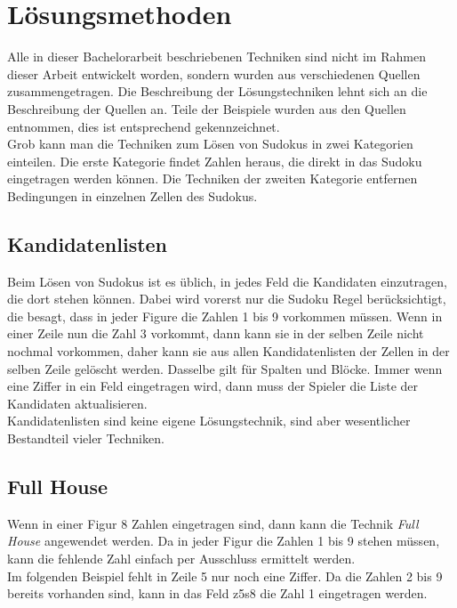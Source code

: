 \documentclass[accentcolor=tud6b,11pt,paper=a4]{tudreport}
\begin{document}
\chapter{L\"osungsmethoden}
Alle in dieser Bachelorarbeit beschriebenen Techniken sind nicht im Rahmen dieser Arbeit entwickelt worden, sondern wurden aus verschiedenen Quellen zusammengetragen. Die Beschreibung der L\"osungstechniken lehnt sich an die Beschreibung der Quellen an. Teile der Beispiele wurden aus den Quellen entnommen, dies ist entsprechend gekennzeichnet.\\
Grob kann man die Techniken zum L\"osen von Sudokus in zwei Kategorien einteilen. Die erste Kategorie findet Zahlen heraus, die direkt in das Sudoku eingetragen werden k\"onnen. Die Techniken der zweiten Kategorie entfernen Bedingungen in einzelnen Zellen des Sudokus.

\section{Kandidatenlisten}
Beim L\"osen von Sudokus ist es \"ublich, in jedes Feld die Kandidaten einzutragen, die dort stehen k\"onnen. Dabei wird vorerst nur die Sudoku Regel ber\"ucksichtigt, die besagt, dass in jeder Figure die Zahlen 1 bis 9 vorkommen m\"ussen. Wenn in einer Zeile nun die Zahl 3 vorkommt, dann kann sie in der selben Zeile nicht nochmal vorkommen, daher kann sie aus allen Kandidatenlisten der Zellen in der selben Zeile gel\"oscht werden. Dasselbe gilt f\"ur Spalten und Bl\"ocke. Immer wenn eine Ziffer in ein Feld eingetragen wird, dann muss der Spieler die Liste der Kandidaten aktualisieren.\\
Kandidatenlisten sind keine eigene L\"osungstechnik, sind aber wesentlicher Bestandteil vieler Techniken.

\newpage
\section{Full House}
Wenn in einer Figur 8 Zahlen eingetragen sind, dann kann die Technik \textit{Full House} angewendet werden. Da in jeder Figur die Zahlen 1 bis 9 stehen m\"ussen, kann die fehlende Zahl einfach per Ausschluss ermittelt werden.\\
Im folgenden Beispiel fehlt in Zeile 5 nur noch eine Ziffer. Da die Zahlen 2 bis 9 bereits vorhanden sind, kann in das Feld z5s8 die Zahl 1 eingetragen werden.
\end{document}
